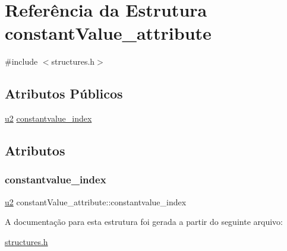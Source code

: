 \hypertarget{structconstantValue__attribute}{}\section{Referência da Estrutura constant\+Value\+\_\+attribute}
\label{structconstantValue__attribute}


{\ttfamily \#include $<$structures.\+h$>$}

\subsection*{Atributos Públicos}
\begin{DoxyCompactItemize}
\item 
\hyperlink{lista__operandos_8h_a732cde1300aafb73b0ea6c2558a7a54f}{u2} \hyperlink{structconstantValue__attribute_a08104752941d024731797a40dbd2d79d}{constantvalue\+\_\+index}
\end{DoxyCompactItemize}


\subsection{Atributos}
\mbox{\label{structconstantValue__attribute_a08104752941d024731797a40dbd2d79d}} 
\subsubsection{\texorpdfstring{constantvalue\+\_\+index}{constantvalue\_index}}
{\footnotesize\ttfamily \hyperlink{lista__operandos_8h_a732cde1300aafb73b0ea6c2558a7a54f}{u2} constant\+Value\+\_\+attribute\+::constantvalue\+\_\+index}



A documentação para esta estrutura foi gerada a partir do seguinte arquivo\+:\begin{DoxyCompactItemize}
\item 
\hyperlink{structures_8h}{structures.\+h}\end{DoxyCompactItemize}
